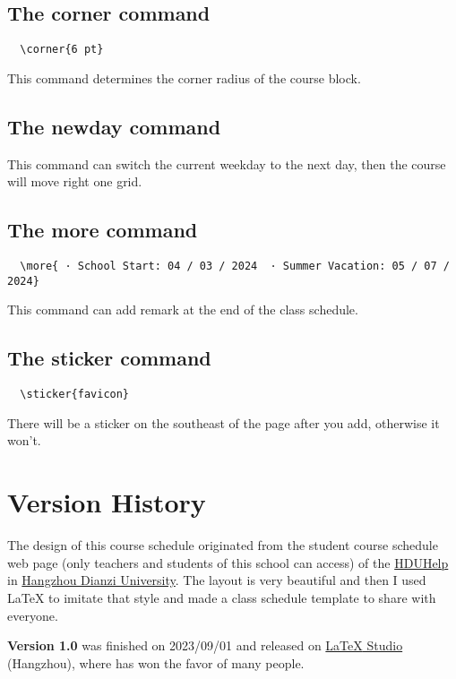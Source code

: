 \documentclass[11pt]{article}
\def\cmd#1{\texorpdfstring{\textcolor{cmdcolor}{\textsf{#1}}}{“#1”}}
\begin{document}
\subsection{The \cmd{corner} command}
\begin{verbatim}
  \corner{6 pt}
\end{verbatim}

This command determines the corner radius of the course block.

\subsection{The \cmd{newday} command}
This command can switch the current weekday to the next day, then the course will move right one grid.

\subsection{The \cmd{more} command}
\begin{verbatim}
  \more{ · School Start: 04 / 03 / 2024  · Summer Vacation: 05 / 07 / 2024}
\end{verbatim}
This command can add remark at the end of the class schedule.

\subsection{The \cmd{sticker} command}
\begin{verbatim}
  \sticker{favicon}
\end{verbatim}
There will be a sticker on the southeast of the page after you add, otherwise it won't.

\section{Version History}

The design of this course schedule originated from the student course schedule web page (only teachers and students of this school can access) of the \href{https://www.hduhelp.cn/}{HDUHelp} in \href{https://www.hdu.edu.cn}{Hangzhou Dianzi University}. The layout is very beautiful and then I used \textsf{\LaTeX} to imitate that style and made a class schedule template to share with everyone.

\textsf{\bfseries Version 1.0} was finished on 2023/09/01 and released on \href{https://www.latexstudio.net}{\textsf{\LaTeX} Studio} (Hangzhou), where has won the favor of many people.
\end{document}
